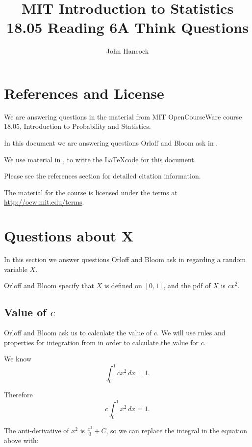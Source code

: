 \documentclass[a4paper,11pt]{article}
\author{John Hancock}
\title{MIT Introduction to Statistics 18.05 Reading 6A Think Questions }
\begin{document}
\maketitle
\tableofcontents
\section{References and License}
We are answering questions in the material from MIT OpenCourseWare
course 18.05, Introduction to Probability and Statistics.

In this document we are answering questions Orloff and Bloom ask in
\cite{slides6}.

We use material in \cite{cubeRoot}, \cite{bold}
to write the \LaTeX code for this
document.

Please see the references section for detailed citation information.

The material for the course is licensed under the terms at
\url{http://ocw.mit.edu/terms}.



\section{Questions about X}

In this section we answer questions Orloff and Bloom ask in \cite{reading6a}
regarding a random variable $X$.

Orloff and Bloom specify that $X$ is defined on $\left[ 0, 1 \right]$, and
the pdf of $X$ is $cx^2$.

\subsection{Value of $c$}

Orloff and Bloom ask us to calculate the value of $c$.  We will use rules
and properties for integration from \cite{basicInt} in order to calculate
the value for $c$.

We know
\begin{equation}
  \int_0^1 cx^2 \, dx = 1.
\end{equation}

Therefore
\begin{equation}
  c \int_0^1 x^2 \, dx = 1.
\end{equation}

The anti-derivative of $x^2$ is $\frac{x^3}{3} +C$, so we can replace the
integral in the equation above with:
\end{document}
